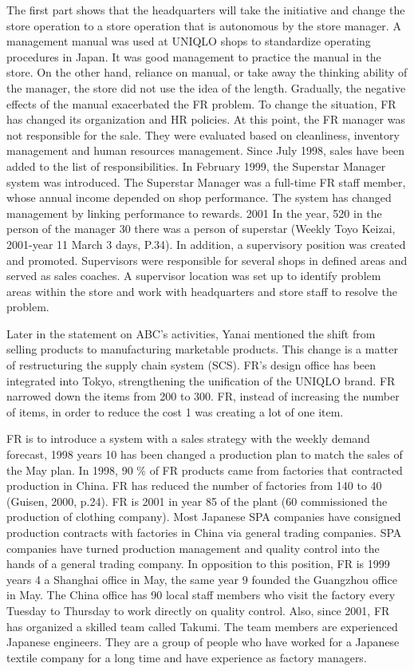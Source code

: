 \documentclass[12pt,a4paper]{article}
\begin{document}
The first part shows that the headquarters will take the initiative and
change the store operation to a store operation that is autonomous by
the store manager. A management manual was used at UNIQLO shops to
standardize operating procedures in Japan. It was good management to
practice the manual in the store. On the other hand, reliance on manual,
or take away the thinking ability of the manager, the store did not use
the idea of the length. Gradually, the negative effects of the manual
exacerbated the FR problem. To change the situation, FR has changed its
organization and HR policies. At this point, the FR manager was not
responsible for the sale. They were evaluated based on cleanliness,
inventory management and human resources management. Since July 1998,
sales have been added to the list of responsibilities. In February 1999,
the Superstar Manager system was introduced. The Superstar Manager was a
full-time FR staff member, whose annual income depended on shop
performance. The system has changed management by linking performance to
rewards. 2001 In the year, 520 in the person of the manager 30 there was
a person of superstar (Weekly Toyo Keizai, 2001-year 11 March 3 days,
P.34). In addition, a supervisory position was created and promoted.
Supervisors were responsible for several shops in defined areas and
served as sales coaches. A supervisor location was set up to identify
problem areas within the store and work with headquarters and store
staff to resolve the problem.

Later in the statement on ABC's activities, Yanai mentioned the shift
from selling products to manufacturing marketable products. This change
is a matter of restructuring the supply chain system (SCS). FR's design
office has been integrated into Tokyo, strengthening the unification of
the UNIQLO brand. FR narrowed down the items from 200 to 300. FR,
instead of increasing the number of items, in order to reduce the cost 1
was creating a lot of one item.

FR is to introduce a system with a sales strategy with the weekly demand
forecast, 1998 years 10 has been changed a production plan to match the
sales of the May plan. In 1998, 90 \% of FR products came from factories
that contracted production in China. FR has reduced the number of
factories from 140 to 40 (Guisen, 2000, p.24). FR is 2001 in year 85 of
the plant (60 commissioned the production of clothing company). Most
Japanese SPA companies have consigned production contracts with
factories in China via general trading companies. SPA companies have
turned production management and quality control into the hands of a
general trading company. In opposition to this position, FR is 1999
years 4 a Shanghai office in May, the same year 9 founded the Guangzhou
office in May. The China office has 90 local staff members who visit the
factory every Tuesday to Thursday to work directly on quality control.
Also, since 2001, FR has organized a skilled team called Takumi. The
team members are experienced Japanese engineers. They are a group of
people who have worked for a Japanese textile company for a long time
and have experience as factory managers.
\end{document}
